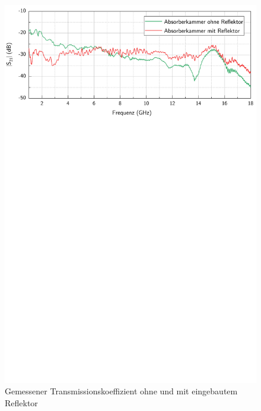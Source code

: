 \begin{figure}[ht]
    \centering
    \includegraphics[page=1, width = .99\textwidth, trim = 0cm 17.3cm 0cm 0cm, clip]{Abbildungen/Kapitel4/Messergebnisse/Vergleich mit und ohne Reflektor (geerdet).pdf}
    \caption{Gemessener Transmissionskoeffizient ohne und mit eingebautem Reflektor}
    \label{fig:4_Vergleich_Reflektor}
\end{figure}

